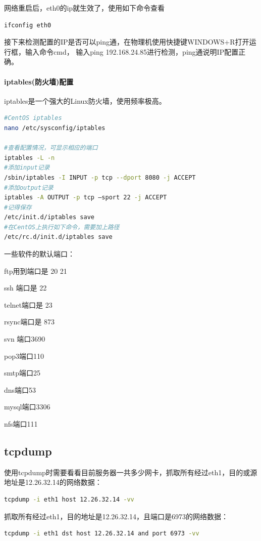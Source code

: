 \documentclass{book}
\begin{document}
网络重启后，eth0的ip就生效了，使用如下命令查看

\begin{lstlisting}[language=Bash]
ifconfig eth0
\end{lstlisting}
 
接下来检测配置的IP是否可以ping通，在物理机使用快捷键WINDOWS+R打开运行框，输入命令cmd，
输入ping 192.168.24.85进行检测，ping通说明IP配置正确。

\paragraph{iptables(防火墙)配置}iptables是一个强大的Linux防火墙，使用频率极高。

\begin{lstlisting}[language=Bash]
#CentOS iptables
nano /etc/sysconfig/iptables

#查看配置情况，可显示相应的端口
iptables -L -n
#添加input记录
/sbin/iptables -I INPUT -p tcp --dport 8080 -j ACCEPT
#添加output记录
iptables -A OUTPUT -p tcp –sport 22 -j ACCEPT
#记得保存
/etc/init.d/iptables save
#在CentOS上执行如下命令，需要加上路径
/etc/rc.d/init.d/iptables save
\end{lstlisting}


一些软件的默认端口：

ftp用到端口是 20 21

ssh 端口是 22

telnet端口是 23

rsync端口是 873

svn 端口3690

pop3端口110

smtp端口25

dns端口53

mysql端口3306

nfs端口111

\subsection{tcpdump}

使用tcpdump时需要看看目前服务器一共多少网卡，抓取所有经过eth1，目的或源地址是12.26.32.14的网络数据：

\begin{lstlisting}[language=Bash]
tcpdump -i eth1 host 12.26.32.14 -vv
\end{lstlisting}

抓取所有经过eth1，目的地址是12.26.32.14，且端口是6973的网络数据：

\begin{lstlisting}[language=Bash]
tcpdump -i eth1 dst host 12.26.32.14 and port 6973 -vv
\end{lstlisting}
\end{document}
